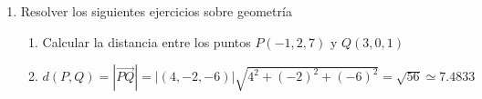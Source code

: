 \documentclass[a4paper]{article}
\newcommand{\answer}{\item[**]}
\newcommand{\exercise}{\item}
\newcommand{\df}[2]{\displaystyle\frac{#1}{#2}}
\newcommand{\vect}[1]{\overrightarrow{#1}}
\newcommand{\degs}{^{\circ}}
\begin{document}
\begin{enumerate}
\begin{multicols}{2}
\begin{enumerate} [label=(\alph*)]
		\item $\rho=3$, $\phi=45\degs$ y $z=2$
		\answer $\vec{v} = (3 \cos{45\degs}, 3 \sin{45\degs}, 2)= \left(\df{3\sqrt{2}}{2}, \df{3\sqrt{2}}{2}, 2 \right)$

		\item $\rho=2$, $\phi=180\degs$ y $z=4$
		\answer $\vec{v} = (2 \cos{180\degs}, 2 \sin{180\degs}, 4)= (-2, 0, 4)$

		\item $\rho=1$, $\phi=300\degs$ y $z=-2$
		\answer $\vec{v} = (1 \cos{300\degs}, 1 \sin{300\degs}, -2)= \left(\df{1}{2}, -\df{\sqrt{3}}{2}, -2 \right)$

		\item $\rho=4$, $\phi=0\degs$ y $z=0$
		\answer $\vec{v} = (4 \cos{0\degs}, 4 \sin{0\degs}, 0)= (4, 0, 0)$

		\item $\rho=0$ y $z=3$
		\answer $\vec{v}=(0,0,3)$

		\item $\left|\vec{v}\right|=5$, $\phi=45\degs$ y $\theta=30\degs$
		\answer $\vec{v} = (5 \sin{30\degs} \cos{45\degs}, 5 \sin{30\degs} \sin{45\degs}, 5 \cos{30\degs})= \left(\df{5\sqrt{2}}{4}, \df{5\sqrt{2}}{4}, \df{5\sqrt{3}}{2} \right)$

		\item $\left|\vec{T}\right|=3$, $\phi=270\degs$ y $\theta=90\degs$
		\answer $\vec{T} = (3 \sin{90\degs} \cos{270\degs}, 3 \sin{90\degs} \sin{270\degs}, 3 \cos{90\degs})= (0, -3, 0)$

		\item $\left|\vec{d}\right|=2$ y $\theta=0\degs$
		\answer $\vec{d} = (0, 0, 2)$

		\item $\left|\vec{F}\right|=1$ y $\theta=180\degs$
		\answer $\vec{F} = (0, 0, -1)$

		\item $\left|\vec{d}\right|=0$
		\answer $\vec{d} = (0, 0, 0)$


	\end{enumerate}
	\end{multicols}

	\exercise Resolver los siguientes ejercicios sobre geometría
	\begin{enumerate} [label=(\alph*)]
		
		\item Calcular la distancia entre los puntos $P(-1,2,7)$ y $Q(3,0,1)$
		\answer $d(P,Q) = \left| \vect{PQ} \right| = \left| (4,-2,-6) \right| \sqrt{4^2+(-2)^2+(-6)^2} = \sqrt{56} \simeq 7.4833$


\end{enumerate}
\end{enumerate}
\end{document}
